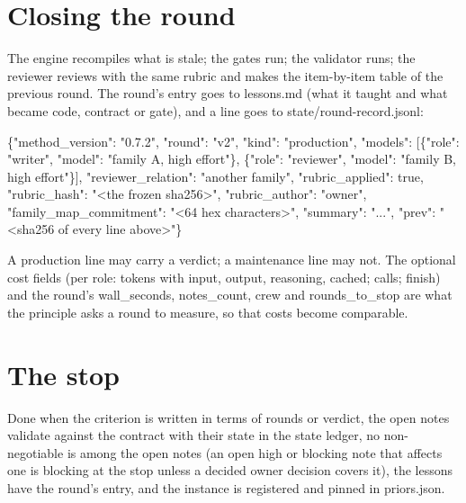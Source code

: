 \documentclass[
  american,
  10pt,
]{report}
\newenvironment{Shaded}{\begin{snugshade}}{\end{snugshade}}
\newcommand{\NormalTok}[1]{#1}
\renewenvironment{Shaded}{%
  \def\FrameCommand{{\color{rulecolor}\vrule width 2pt}\hspace{6pt}\colorbox{shadecolor}}%
  \MakeFramed{\advance\hsize-\width\FrameRestore}\small}%
  {\endMakeFramed}
\renewcommand{\texttt}[1]{{\ttfamily\hyphenchar\font=-1 #1}}
\begin{document}
\section{Closing the round}\label{closing-the-round}

The engine recompiles what is stale; the gates run; the validator runs;
the reviewer reviews with the same rubric and makes the item-by-item
table of the previous round. The round's entry goes to
\texttt{lessons.\allowbreak{}md} (what it taught and what became code,
contract or gate), and a line goes to
\texttt{state/\allowbreak{}round-\allowbreak{}record.\allowbreak{}jsonl}:

\begin{Shaded}
\begin{Highlighting}[]
\NormalTok{\{"method\_version": "0.7.2", "round": "v2", "kind": "production",}
\NormalTok{ "models": [\{"role": "writer", "model": "family A, high effort"\},}
\NormalTok{            \{"role": "reviewer", "model": "family B, high effort"\}],}
\NormalTok{ "reviewer\_relation": "another family",}
\NormalTok{ "rubric\_applied": true, "rubric\_hash": "\textless{}the frozen sha256\textgreater{}", "rubric\_author": "owner",}
\NormalTok{ "family\_map\_commitment": "\textless{}64 hex characters\textgreater{}",}
\NormalTok{ "summary": "...", "prev": "\textless{}sha256 of every line above\textgreater{}"\}}
\end{Highlighting}
\end{Shaded}

A production line may carry a \texttt{verdict}; a maintenance line may
not. The optional cost fields (per role: \texttt{tokens} with
\texttt{input}, \texttt{output}, \texttt{reasoning}, \texttt{cached};
\texttt{calls}; \texttt{finish}) and the round's
\texttt{wall\_\allowbreak{}seconds}, \texttt{notes\_\allowbreak{}count},
\texttt{crew} and \texttt{rounds\_\allowbreak{}to\_\allowbreak{}stop}
are what the principle asks a round to measure, so that costs become
comparable.

\section{The stop}\label{the-stop}

Done when the criterion is written in terms of rounds or verdict, the
open notes validate against the contract with their state in the state
ledger, no non-negotiable is among the open notes (an open high or
blocking note that affects one is blocking at the stop unless a decided
owner decision covers it), the lessons have the round's entry, and the
instance is registered and pinned in \texttt{priors.\allowbreak{}json}.
\end{document}

